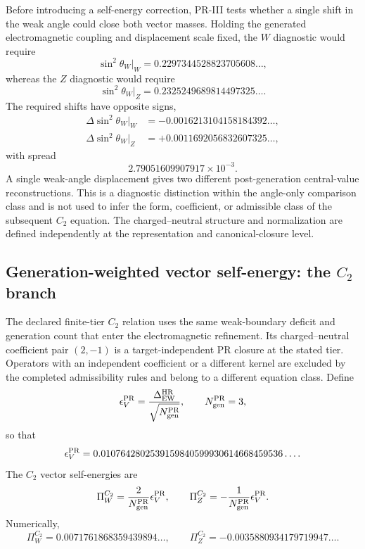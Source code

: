 \documentclass[11pt]{article}
\begin{document}
Before introducing a self-energy correction, PR-III tests whether a single shift in the weak angle could close both vector masses.  Holding the generated electromagnetic coupling and displacement scale fixed, the \(W\) diagnostic would require
\begin{equation}
\sin^2\theta_W\big|_W
=
0.2297344528823705608\ldots,
\end{equation}
whereas the \(Z\) diagnostic would require
\begin{equation}
\sin^2\theta_W\big|_Z
=
0.2325249689814497325\ldots .
\end{equation}
The required shifts have opposite signs,
\begin{align}
\Delta\sin^2\theta_W\big|_W
&=
-0.0016213104158184392\ldots,
\\
\Delta\sin^2\theta_W\big|_Z
&=
+0.0011692056832607325\ldots,
\end{align}
with spread
\begin{equation}
2.79051609907917\times10^{-3}.
\end{equation}
A single weak-angle displacement gives two different post-generation central-value reconstructions.  This is a diagnostic distinction within the
angle-only comparison class and is not used to infer the form, coefficient, or admissible class of the subsequent \(C_2\) equation.  The charged--neutral structure and normalization are defined independently at the representation and canonical-closure level.

\subsection{Generation-weighted vector self-energy: the \(C_2\) branch}
\label{subsec:priii-ew-C2-vector-self-energy}

The declared finite-tier \(C_2\) relation uses the same weak-boundary deficit and generation count that enter the electromagnetic refinement.  Its charged--neutral coefficient pair \((2,-1)\) is a target-independent PR closure at the stated tier.  Operators with an independent coefficient or a different kernel are excluded by the completed admissibility rules and belong to a different equation class.  Define
\begin{equation}
\epsilon_V^{\rm PR}
=
\frac{\Delta_{\rm EW}^{\rm HR}}
{\sqrt{N_{\rm gen}^{\rm PR}}},
\qquad
N_{\rm gen}^{\rm PR}=3,
\end{equation}
so that
\begin{equation}
\epsilon_V^{\rm PR}
=
0.0107642802539159840599930614668459536\ldots .
\end{equation}
The \(C_2\) vector self-energies are
\begin{equation}
\Pi_W^{C_2}
=
\frac{2}{N_{\rm gen}^{\rm PR}}\epsilon_V^{\rm PR},
\qquad
\Pi_Z^{C_2}
=
-\frac{1}{N_{\rm gen}^{\rm PR}}\epsilon_V^{\rm PR}.
\label{eq:priii-ew-C2-self-energies}
\end{equation}
Numerically,
\begin{equation}
\Pi_W^{C_2}
=
0.0071761868359439894\ldots,
\qquad
\Pi_Z^{C_2}
=
-0.0035880934179719947\ldots .
\end{equation}
\end{document}
